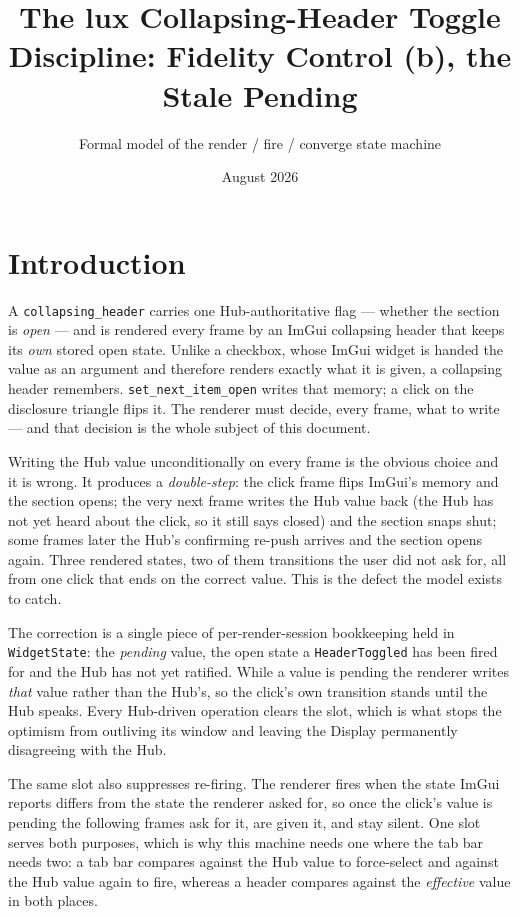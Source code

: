 \documentclass[a4paper,10pt,fleqn]{article}
\begin{document}
\title{The lux Collapsing-Header Toggle Discipline: Fidelity Control (b), the Stale Pending}
\author{Formal model of the render / fire / converge state machine}
\date{August 2026}
\maketitle

\section{Introduction}

A \texttt{collapsing\_header} carries one Hub-authoritative flag --- whether the
section is \emph{open} --- and is rendered every frame by an ImGui collapsing
header that keeps its \emph{own} stored open state.  Unlike a checkbox, whose
ImGui widget is handed the value as an argument and therefore renders exactly
what it is given, a collapsing header remembers.  \texttt{set\_next\_item\_open}
writes that memory; a click on the disclosure triangle flips it.  The renderer
must decide, every frame, what to write --- and that decision is the whole
subject of this document.

Writing the Hub value unconditionally on every frame is the obvious choice and
it is wrong.  It produces a \emph{double-step}: the click frame flips ImGui's
memory and the section opens; the very next frame writes the Hub value back
(the Hub has not yet heard about the click, so it still says closed) and the
section snaps shut; some frames later the Hub's confirming re-push arrives and
the section opens again.  Three rendered states, two of them transitions the
user did not ask for, all from one click that ends on the correct value.  This
is the defect the model exists to catch.

The correction is a single piece of per-render-session bookkeeping held in
\texttt{WidgetState}: the \emph{pending} value, the open state a
\texttt{HeaderToggled} has been fired for and the Hub has not yet ratified.
While a value is pending the renderer writes \emph{that} value rather than the
Hub's, so the click's own transition stands until the Hub speaks.  Every
Hub-driven operation clears the slot, which is what stops the optimism from
outliving its window and leaving the Display permanently disagreeing with the
Hub.

The same slot also suppresses re-firing.  The renderer fires when the state
ImGui reports differs from the state the renderer asked for, so once the click's
value is pending the following frames ask for it, are given it, and stay silent.
One slot serves both purposes, which is why this machine needs one where the
tab bar needs two: a tab bar compares against the Hub value to force-select and
against the Hub value again to fire, whereas a header compares against the
\emph{effective} value in both places.
\end{document}
